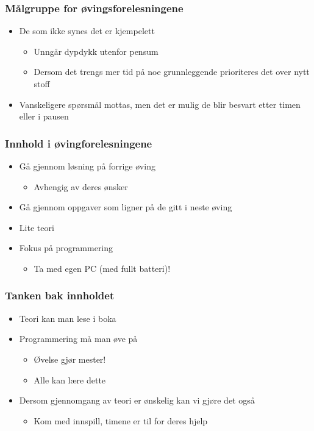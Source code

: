 \documentclass[screen, aspectratio=169]{beamer}
\begin{document}
\begin{frame}
	\frametitle{Målgruppe for øvingsforelesningene}
	\begin{itemize}
		\item De som ikke synes det er kjempelett
		\begin{itemize}
			\item Unngår dypdykk utenfor pensum
			\item Dersom det trengs mer tid på noe grunnleggende prioriteres det over nytt stoff
		\end{itemize}
		\item Vanskeligere spørsmål mottas, men det er mulig de blir besvart etter timen eller i pausen
	\end{itemize}
\end{frame}

\begin{frame}
	\frametitle{Innhold i øvingforelesningene}
	\begin{itemize}
		\item Gå gjennom løsning på forrige øving
		\begin{itemize}
			\item Avhengig av deres ønsker
		\end{itemize}
		\item Gå gjennom oppgaver som ligner på de gitt i neste øving
		\item Lite teori
		\item Fokus på programmering
		\begin{itemize}
			\item Ta med egen PC (med fullt batteri)!
		\end{itemize}
	\end{itemize}
\end{frame}

\begin{frame}
	\frametitle{Tanken bak innholdet}
	\begin{itemize}
		\item Teori kan man lese i boka
		\item Programmering må man øve på
		\begin{itemize}
			\item Øvelse gjør mester!
			\item Alle kan lære dette
		\end{itemize}
		\item Dersom gjennomgang av teori er ønskelig kan vi gjøre det også
		\begin{itemize}
			\item Kom med innspill, timene er til for deres hjelp
		\end{itemize}
	\end{itemize}
\end{frame}
\end{document}
